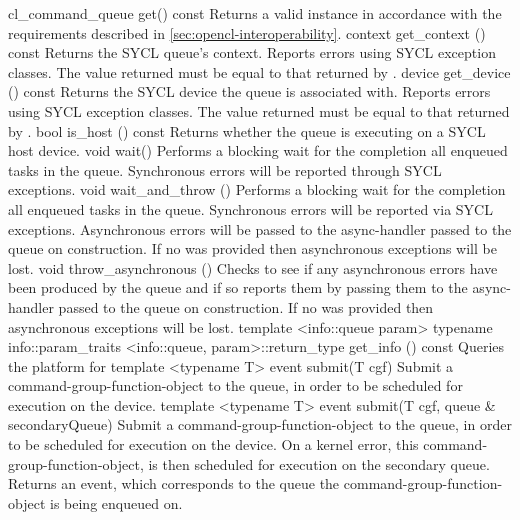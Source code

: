   \addRow
    {cl_command_queue get() const}
    {   
      Returns a valid  instance in accordance with the requirements described in \ref{sec:opencl-interoperability}.    
    }
  \addRow
    {context get_context () const}
    {
      Returns the SYCL queue's context.
      Reports errors using SYCL exception classes.
      The value returned must be equal to that returned by .
    }
  \addRow
    {device get_device () const}
    {
      Returns the SYCL device the queue is associated with.
      Reports errors using SYCL exception classes.
      The value returned must be equal to that returned by .
    }
  \addRow
   {bool is_host () const}
   {
      Returns whether the queue is executing on a SYCL host device.
   }
  \addRow
    {void wait() }
    {
      Performs a blocking wait for the completion all enqueued tasks
      in the queue.  Synchronous errors will be reported through SYCL
      exceptions.
    }
  \addRow
    {void wait_and_throw () }
    {
      Performs a blocking wait for the completion all enqueued tasks
      in the queue.  Synchronous errors will be reported via SYCL
      exceptions. Asynchronous errors will be passed to the
      \gls{async-handler} passed to the queue on
      construction. If no  was provided then
      asynchronous exceptions will be lost.
    }
  \addRow
    {void throw_asynchronous () }
    {
      Checks to see if any asynchronous errors have been produced by
      the queue and if so reports them by passing them to the
      \gls{async-handler} passed to the queue on
      construction. If no  was provided then
      asynchronous exceptions will be lost.
    }
  \addRowFourL
    { template <info::queue param> }
    {  typename info::param_traits}
    {  <info::queue, param>::return_type}
    {  get_info ()  const}
    {Queries the platform for }
  \addRowTwoL
    {template <typename T>}
    {event submit(T cgf)}
    {Submit a \gls{command-group-function-object} to the queue, in order to be scheduled
    for execution on the device.}
  \addRowThreeL
    {template <typename T>}
    {event submit(T cgf,}
    {             queue \& secondaryQueue)}
    {Submit a \gls{command-group-function-object} to the queue, in order to be scheduled
    for execution on the device. On a kernel error, this \gls{command-group-function-object},
    is then scheduled for execution on the secondary queue. Returns an
    event, which corresponds to the queue the \gls{command-group-function-object}
    is being enqueued on.}
\completeTable

